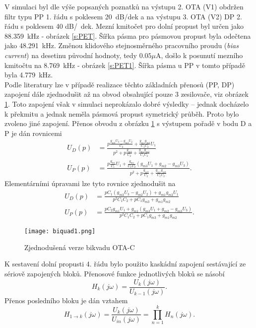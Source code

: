 \noindent 
V simulaci byl dle výše popsaných poznatků na výstupu 2. OTA (V1) obdržen filtr typu PP 1. řádu s poklesem 20~dB/dek a na výstupu 3. OTA (V2) DP 2. řádu s poklesem 40 dB/~dek. Mezní kmitočet pro dolní propust byl určen jako 88.359~kHz - obrázek \ref{s:PET}. Šířka pásma pro pásmovou propust byla odečtena jako 48.291~kHz. Změnou klidového stejnosměrného pracovního proudu (\textit{bias current}) na desetinu původní hodnoty, tedy $0.05 \mu$A, došlo k posunutí mezního kmitočtu na 8.769~kHz - obrázek \ref{s:PET1}. Šířka pásma u PP v tomto případě byla 4.779~kHz.\\
\noindent Podle literatury \cite{10} lze v případě realizace těchto základních přenosů (PP, DP) zapojení dále zjednodušit až na obvod obsahující pouze 3 zesilovače, viz obrázek \ref{s:BIK2}. Toto zapojení však v simulaci neprokázalo dobré výsledky -- jednak docházelo k překmitu a jednak neměla pásmová propust symetrický průběh. Proto bylo zvoleno jiné zapojení. Přenos obvodu z obrázku \ref{s:BIK2} s výstupem pořadě v bodu D a P je dán rovnicemi
\begin{align}
U_D(p) &= \frac{p\frac{g_{m3}U_3-g_{m2}U_2}{C_2}+\frac{g_{m1}g_{m2}}{C_1C_2}U_1}{p^2 + p\frac{g_{m3}}{C_2} + \frac{g_{m1}g_{m2}}{C_1C_2}}\\
U_P(p) &= \frac{p\frac{g_{m1}}{C_1}U_1 + \frac{g_{m1}}{C_1C_2}(g_{m3}U_1+g_{m2}-g_{m3}U_3)}{p^2 + p\frac{g_{m3}}{C_2} + \frac{g_{m1}g_{m2}}{C_1C_2}}.
\end{align}
\noindent Elementárními úpravami lze tyto rovnice zjednodušit na
\begin{align}
U_D(p) &= \frac{pC_1(g_{m3}U_3 - g_{m2}U_2) + g_{m1}g_{m2}U_1}{p^2C_1C_2 + pC_1g_{m3} + g_{m1}g_{m2}}\\
U_P(p) &= \frac{pC_2g_{m1}U_1 + g_{m1}(g_{m3}U_1 + g_{m2} - g_{m3}U_3)}{p^2C_1C_2 + pC_1g_{m3} + g_{m1}g_{m2}}.
\end{align}
\begin{figure}[h]
\centering
\texttt{[image: biquad1.png]}
\caption[Zjednodušená verze bikvadu OTA-C]{Zjednodušená verze bikvadu OTA-C \label{s:BIK2}}
\end{figure}
\noindent K sestavení dolní propusti 4. řádu bylo použito kaskádní zapojení sestávající ze sériově zapojených bloků. Přenosové funkce jednotlivých bloků se násobí
\begin{equation}
H_k(j\omega) = \frac{U_k (j\omega)}{U_{k-1}(j\omega)}.
\end{equation}
Přenos posledního bloku je dán vztahem
\begin{equation}
H_{1 \rightarrow k}(j\omega) = \frac{U_k (j\omega)}{U_{in}(j\omega)} = \prod _{n=1}^{k} H_n(j\omega).
\end{equation}
